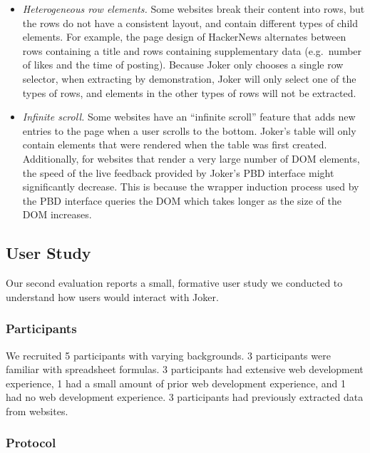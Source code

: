 \documentclass[sigconf,10pt]{acmart}
\providecommand{\tightlist}{%
  \setlength{\itemsep}{0pt}\setlength{\parskip}{0pt}}
\begin{document}
\begin{itemize}
\tightlist
\item
  \emph{Heterogeneous row elements.} Some websites break their content
  into rows, but the rows do not have a consistent layout, and contain
  different types of child elements. For example, the page design of
  HackerNews alternates between rows containing a title and rows
  containing supplementary data (e.g.~number of likes and the time of
  posting). Because Joker only chooses a single row selector, when
  extracting by demonstration, Joker will only select one of the types
  of rows, and elements in the other types of rows will not be
  extracted.
\item
  \emph{Infinite scroll.} Some websites have an ``infinite scroll''
  feature that adds new entries to the page when a user scrolls to the
  bottom. Joker's table will only contain elements that were rendered
  when the table was first created. Additionally, for websites that
  render a very large number of DOM elements, the speed of the live
  feedback provided by Joker's PBD interface might significantly
  decrease. This is because the wrapper induction process used by the
  PBD interface queries the DOM which takes longer as the size of the
  DOM increases.
\end{itemize}

\hypertarget{user-study}{%
\subsection{User Study}\label{user-study}}

Our second evaluation reports a small, formative user study we conducted
to understand how users would interact with Joker.

\hypertarget{participants}{%
\subsubsection{Participants}\label{participants}}

We recruited 5 participants with varying backgrounds. 3 participants
were familiar with spreadsheet formulas. 3 participants had extensive
web development experience, 1 had a small amount of prior web
development experience, and 1 had no web development experience. 3
participants had previously extracted data from websites.

\hypertarget{protocol}{%
\subsubsection{Protocol}\label{protocol}}
\end{document}
